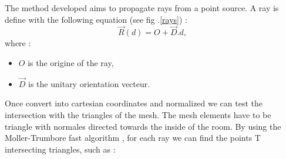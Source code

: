 \documentclass[AMA,STIX1COL]{WileyNJD-v2}
\begin{document}
The method developed aims to propagate rays from a point source. A ray is define with the following equation (see fig .\ref{rays}) :
\begin{equation}
\overrightarrow{R}(d) = O + \overrightarrow{D}.d,
\end{equation}
where :
\begin{itemize}
\item $O$ is the origine of the ray,
\item $\overrightarrow{D}$ is the unitary orientation vecteur.
\end{itemize}


Once convert into cartesian coordinates and normalized we can test the intersection with the triangles of the mesh. The mesh elements have to be triangle with normales directed towards the inside of the room. By using the Moller-Trumbore fast algorithm \cite{moller}, for  each ray we can find the points T intersecting triangles, such as :
\end{document}
